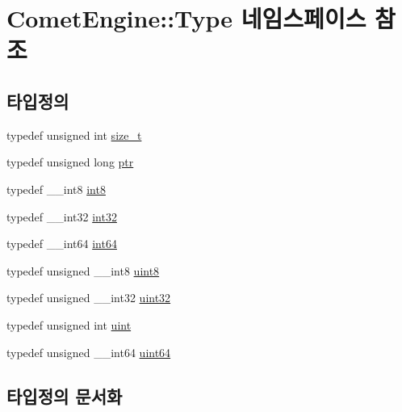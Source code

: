 \hypertarget{namespace_comet_engine_1_1_type}{}\section{Comet\+Engine\+:\+:Type 네임스페이스 참조}
\label{namespace_comet_engine_1_1_type}
\subsection*{타입정의}
\begin{DoxyCompactItemize}
\item 
typedef unsigned int \hyperlink{namespace_comet_engine_1_1_type_a7c94ea6f8948649f8d181ae55911eeaf}{size\+\_\+t}
\item 
typedef unsigned long \hyperlink{namespace_comet_engine_1_1_type_aeb22ad46de677e9a50679dfebeb0e6f0}{ptr}
\item 
typedef \+\_\+\+\_\+int8 \hyperlink{namespace_comet_engine_1_1_type_aaf44e46c719bc25ff3de1341e7aa4094}{int8}
\item 
typedef \+\_\+\+\_\+int32 \hyperlink{namespace_comet_engine_1_1_type_ad3ce9f24199b79b2629169eebf59489b}{int32}
\item 
typedef \+\_\+\+\_\+int64 \hyperlink{namespace_comet_engine_1_1_type_a92a47ab0e245f0ae4d01c38a64b6c427}{int64}
\item 
typedef unsigned \+\_\+\+\_\+int8 \hyperlink{namespace_comet_engine_1_1_type_a1b09856a6463f2bcc4bd8ff0e4e3ee0f}{uint8}
\item 
typedef unsigned \+\_\+\+\_\+int32 \hyperlink{namespace_comet_engine_1_1_type_ada4c95a4173a4bb540c8a7f80f3665d2}{uint32}
\item 
typedef unsigned int \hyperlink{namespace_comet_engine_1_1_type_a91ad9478d81a7aaf2593e8d9c3d06a14}{uint}
\item 
typedef unsigned \+\_\+\+\_\+int64 \hyperlink{namespace_comet_engine_1_1_type_ac6afe794ed283c11fb63426a58188e5e}{uint64}
\end{DoxyCompactItemize}


\subsection{타입정의 문서화}
\mbox{\label{namespace_comet_engine_1_1_type_ad3ce9f24199b79b2629169eebf59489b}} 
